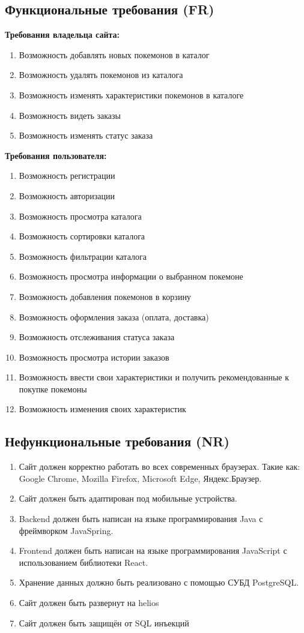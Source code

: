 \documentclass[12pt,onecolumn]{article}
\begin{document}
\subsection{Функциональные требования (FR)}
\textbf{Требования владельца сайта:}
\begin{enumerate}
  \item Возможность добавлять новых покемонов в каталог
  \item Возможность удалять покемонов из каталога
  \item Возможность изменять характеристики покемонов в каталоге
  \item Возможность видеть заказы
  \item Возможность изменять статус заказа
\end{enumerate}
\textbf{Требования пользователя:}
\begin{enumerate}
  \item Возможность регистрации
  \item Возможность авторизации
  \item Возможность просмотра каталога
  \item Возможность сортировки каталога
  \item Возможность фильтрации каталога
  \item Возможность просмотра информации о выбранном покемоне
  \item Возможность добавления покемонов в корзину
  \item Возможность оформления заказа (оплата, доставка)
  \item Возможность отслеживания статуса заказа
  \item Возможность просмотра истории заказов
  \item Возможность ввести свои характеристики и получить рекомендованные к покупке покемоны
  \item Возможность изменения своих характеристик
\end{enumerate}
\subsection{Нефункциональные требования (NR)}
\begin{enumerate}
  \item Сайт должен корректно работать во всех современных браузерах. Такие как:
  Google Chrome, Mozilla Firefox, Microsoft Edge, Яндекс.Браузер.
  \item Сайт должен быть адаптирован под мобильные устройства.
  \item Backend должен быть написан на языке программирования Java с фреймворком JavaSpring.
  \item Frontend должен быть написан на языке программирования JavaScript с использованием библиотеки React.
  \item Хранение данных должно быть реализовано с помощью СУБД PostgreSQL.
  \item Сайт должен быть развернут на helios
  \item Сайт должен быть защищён от SQL инъекций
\end{enumerate}
\end{document}
